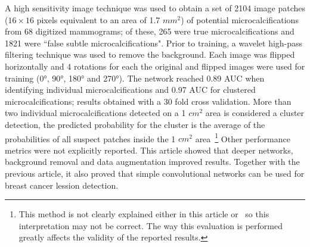 A high sensitivity image technique was used to obtain a set of 2104 image patches ($16 \times 16$ pixels equivalent to an area of 1.7 $mm^2$) of potential microcalcifications from 68 digitized mammograms; of these, 265 were true microcalcifications and 1821 were ``false subtle microcalcifications". Prior to training, a wavelet high-pass filtering technique was used to remove the background. Each image was flipped horizontally and 4 rotations for each the original and flipped images were used for training (0°, 90°, 180° and 270°).
The network reached 0.89 AUC when identifying individual microcalcifications and 0.97 AUC for clustered microcalcifications; results obtained with a 30 fold cross validation. More than two individual microcalcifications detected on a 1 $cm^2$ area is considered a cluster detection, the predicted probability for the cluster is the average of the probabilities of all suspect patches inside the 1 $cm^2$ area~\footnote{This method is not clearly explained either in this article or~\cite{Lo1998} so this interpretation may not be correct. The way this evaluation is performed greatly affects the validity of the reported results.} Other performance metrics were not explicitly reported.
This article showed that deeper networks, background removal and data augmentation improved results. Together with the previous article, it also proved that simple convolutional networks can be used for breast cancer lession detection. 


